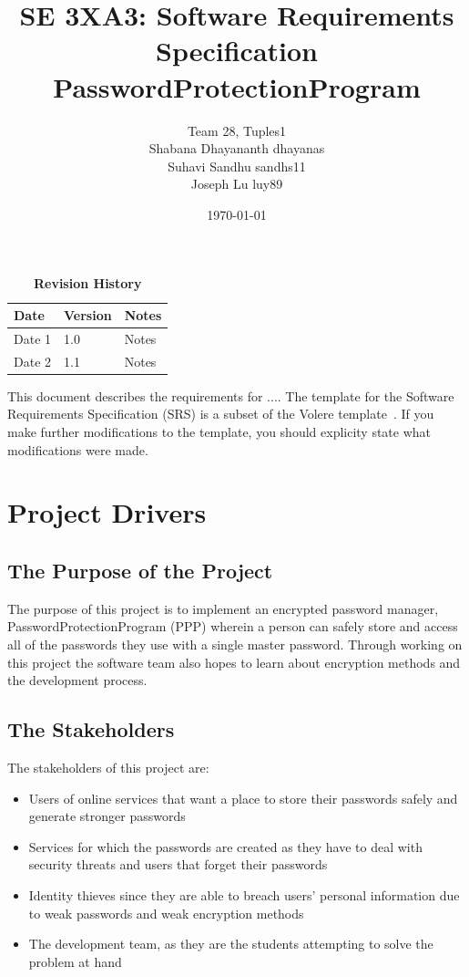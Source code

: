 \documentclass[12pt, titlepage]{article}
\title{SE 3XA3: Software Requirements Specification\\PasswordProtectionProgram}
\author{Team 28, Tuples1
		\\ Shabana Dhayananth dhayanas
		\\  Suhavi Sandhu sandhs11
		\\ Joseph Lu luy89
}
\date{\today}
\begin{document}
\maketitle

\tableofcontents
\listoftables
\listoffigures

\begin{table}[bp]
\caption{\bf Revision History}
\begin{tabularx}{\textwidth}{p{3cm}p{2cm}X}
\toprule {\bf Date} & {\bf Version} & {\bf Notes}\\
\midrule
Date 1 & 1.0 & Notes\\
Date 2 & 1.1 & Notes\\
\bottomrule
\end{tabularx}
\end{table}

\newpage


This document describes the requirements for ....  The template for the Software
Requirements Specification (SRS) is a subset of the Volere
template~\citep{RobertsonAndRobertson2012}.  If you make further modifications
to the template, you should explicity state what modifications were made.

\section{Project Drivers}

\subsection{The Purpose of the Project}

The purpose of this project is to implement an encrypted password manager,  PasswordProtectionProgram (PPP) 
wherein a person can safely store and access all of the passwords they use with a single master password. 
Through working on this project the software team also hopes to learn about encryption methods and the 
development process.

\subsection{The Stakeholders}

The stakeholders of this project are:
\begin{itemize}
\item Users of online services that want a place to store their passwords safely and generate stronger passwords
\item Services for which the passwords are created as they have to deal with security threats and users that forget their passwords
\item Identity thieves since they are able to breach users’ personal information due to weak passwords and weak encryption methods
\item The development team, as they are the students attempting to solve the problem at hand
\end{itemize}
\end{document}
